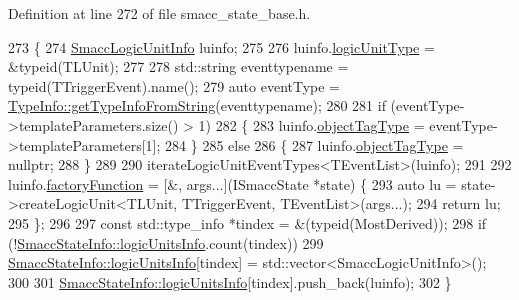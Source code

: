 Definition at line 272 of file smacc\+\_\+state\+\_\+base.\+h.


\begin{DoxyCode}
273   \{
274     \hyperlink{structsmacc_1_1introspection_1_1SmaccLogicUnitInfo}{SmaccLogicUnitInfo} luinfo;
275 
276     luinfo.\hyperlink{structsmacc_1_1introspection_1_1SmaccLogicUnitInfo_af399d58635280862b10116c76cb6e0f8}{logicUnitType} = &\textcolor{keyword}{typeid}(TLUnit);
277 
278     std::string eventtypename = \textcolor{keyword}{typeid}(TTriggerEvent).name();
279     \textcolor{keyword}{auto} eventType = \hyperlink{classsmacc_1_1introspection_1_1TypeInfo_a47d65b6c61499d7ae8ab9f6325c84837}{TypeInfo::getTypeInfoFromString}(eventtypename);
280 
281     \textcolor{keywordflow}{if} (eventType->templateParameters.size() > 1)
282     \{
283       luinfo.\hyperlink{structsmacc_1_1introspection_1_1SmaccLogicUnitInfo_a4a1fc60624c6ad423c28a0bece4805ea}{objectTagType} = eventType->templateParameters[1];
284     \}
285     \textcolor{keywordflow}{else}
286     \{
287       luinfo.\hyperlink{structsmacc_1_1introspection_1_1SmaccLogicUnitInfo_a4a1fc60624c6ad423c28a0bece4805ea}{objectTagType} = \textcolor{keyword}{nullptr};
288     \}
289 
290     iterateLogicUnitEventTypes<TEventList>(luinfo);
291 
292     luinfo.\hyperlink{structsmacc_1_1introspection_1_1SmaccLogicUnitInfo_ad98da99b4913a3dcad4309005cf30072}{factoryFunction} = [&, args...](ISmaccState *state) \{
293       \textcolor{keyword}{auto} lu = state->createLogicUnit<TLUnit, TTriggerEvent, TEventList>(args...);
294       \textcolor{keywordflow}{return} lu;
295     \};
296 
297     \textcolor{keyword}{const} std::type\_info *tindex = &(\textcolor{keyword}{typeid}(MostDerived));
298     \textcolor{keywordflow}{if} (!\hyperlink{classsmacc_1_1introspection_1_1SmaccStateInfo_a7a22f3c1ea22042a19f897db4ecfeb67}{SmaccStateInfo::logicUnitsInfo}.count(tindex))
299       \hyperlink{classsmacc_1_1introspection_1_1SmaccStateInfo_a7a22f3c1ea22042a19f897db4ecfeb67}{SmaccStateInfo::logicUnitsInfo}[tindex] = 
      std::vector<SmaccLogicUnitInfo>();
300 
301     \hyperlink{classsmacc_1_1introspection_1_1SmaccStateInfo_a7a22f3c1ea22042a19f897db4ecfeb67}{SmaccStateInfo::logicUnitsInfo}[tindex].push\_back(luinfo);
302   \}
\end{DoxyCode}
